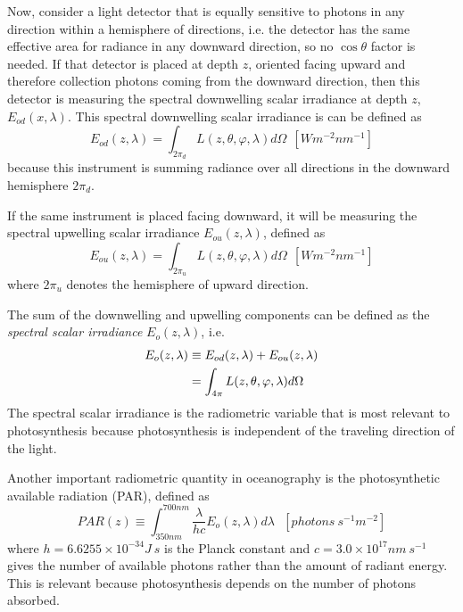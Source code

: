Now, consider a light detector that is equally sensitive to photons in any direction within a hemisphere of directions, i.e. the detector has the same effective area for radiance in any downward direction, so no $\cos{\theta}$ factor is needed. If that detector is placed at depth $z$, oriented facing upward and therefore collection photons coming from the downward direction, then this detector is measuring the spectral downwelling scalar irradiance at depth $z$, $E_{od}(x,\lambda)$. This spectral downwelling scalar irradiance is can be defined as
\begin{equation}\label{eq:Eod}
  E_{od}(z,\lambda)=\int_{2\pi_d} L(z,\theta,\varphi,\lambda)d\Omega~~\left[Wm^{-2}nm^{-1} \right]
\end{equation}
because this instrument is summing radiance over all directions in the downward hemisphere $2\pi_d$.

If the same instrument is placed facing downward, it will be measuring the spectral upwelling scalar irradiance $ E_{ou}(z,\lambda)$, defined as
\begin{equation}
  E_{ou}(z,\lambda)=\int_{2\pi_u} L(z,\theta,\varphi,\lambda)d\Omega~~\left[Wm^{-2}nm^{-1} \right]
\end{equation}
where $2\pi_u$ denotes the hemisphere of upward direction.

The sum of the downwelling and upwelling components can be defined as the {\it spectral scalar irradiance} $E_o(z,\lambda)$, i.e.
\begin{align}
  E_{o}(z,\lambda) &\equiv E_{od}(z,\lambda)+E_{ou}(z,\lambda)\notag \\
           &=\int_{4\pi} L(z,\theta,\varphi,\lambda)d\Omega
\end{align}
The spectral scalar irradiance is the radiometric variable that is most relevant to photosynthesis because photosynthesis is independent of the traveling direction of the light.

Another important radiometric quantity in oceanography is the photosynthetic available radiation (PAR), defined as
\begin{equation}
  PAR(z)\equiv \int_{350nm}^{700nm} \frac{\lambda}{hc}E_o(z,\lambda)d\lambda~~~\left[photons~s^{-1}m^{-2} \right]
\end{equation}
where $h=6.6255\times10^{-34}J~s$ is the Planck constant and $c=3.0\times10^{17}nm~s^{-1}$ gives the number of available photons rather than the amount of radiant energy. This is relevant because photosynthesis depends on the number of photons absorbed.

